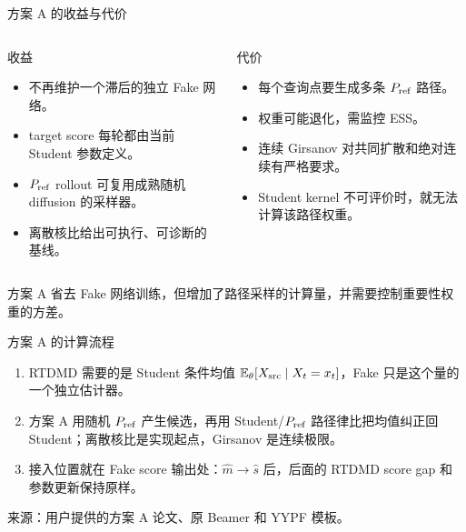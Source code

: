 \documentclass[10pt,aspectratio=169]{beamer}
\newcommand{\E}{\mathbb E}
\newcommand{\sourceline}[1]{\par{\scriptsize\color{gray}#1}\par}
\begin{document}
\begin{frame}{方案 A 的收益与代价}
\begin{columns}[T,onlytextwidth]
\begin{exampleblock}{收益}
\begin{itemize}\itemsep2pt
\item 不再维护一个滞后的独立 Fake 网络。
\item target score 每轮都由当前 Student 参数定义。
\item \ensuremath{P_{\rm ref}} rollout 可复用成熟随机 diffusion 的采样器。
\item 离散核比给出可执行、可诊断的基线。
\end{itemize}
\end{exampleblock}
\begin{alertblock}{代价}
\begin{itemize}\itemsep2pt
\item 每个查询点要生成多条 \ensuremath{P_{\rm ref}} 路径。
\item 权重可能退化，需监控 ESS。
\item 连续 Girsanov 对共同扩散和绝对连续有严格要求。
\item Student kernel 不可评价时，就无法计算该路径权重。
\end{itemize}
\end{alertblock}
\end{columns}
{\small 方案 A 省去 Fake 网络训练，但增加了路径采样的计算量，并需要控制重要性权重的方差。}
\end{frame}

\begin{frame}{方案 A 的计算流程}
\begin{enumerate}\itemsep6pt
\item RTDMD 需要的是 Student 条件均值 $\E_\theta[X_{\rm src}\mid X_t=x_t]$，Fake 只是这个量的一个独立估计器。
\item 方案 A 用随机 \ensuremath{P_{\rm ref}} 产生候选，再用 Student/\ensuremath{P_{\rm ref}} 路径律比把均值纠正回 Student；离散核比是实现起点，Girsanov 是连续极限。
\item 接入位置就在 Fake score 输出处：$\widehat m\to\widehat s$ 后，后面的 RTDMD score gap 和参数更新保持原样。
\end{enumerate}
\vspace{3mm}
\begin{center}
\end{center}
\sourceline{来源：用户提供的方案 A 论文、原 Beamer 和 YYPF 模板。}
\end{frame}
\end{document}
